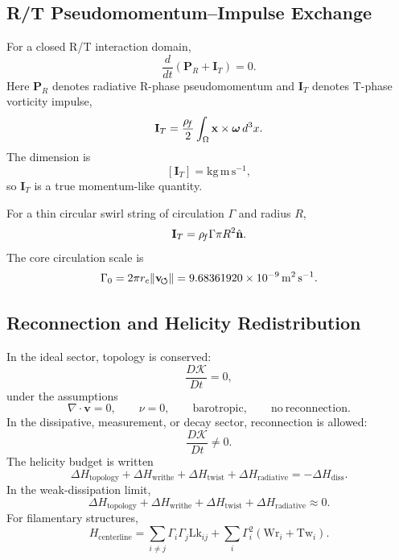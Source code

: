     \subsection{R/T Pseudomomentum--Impulse Exchange}
        
        For a closed R/T interaction domain,
        \[
            \frac{d}{dt}
            \left(
                \mathbf P_R+\mathbf I_T
            \right)
            =
            0.
        \]
        Here \(\mathbf P_R\) denotes radiative R-phase pseudomomentum and
        \(\mathbf I_T\) denotes T-phase vorticity impulse,
        \[
            \mathbf I_T
            =
            \frac{\rho_{\!f}}{2}
            \int_{\Omega}
            \mathbf x\times\boldsymbol\omega\,d^3x .
        \]
        The dimension is
        \[
            [\mathbf I_T]
            =
            \mathrm{kg\,m\,s^{-1}},
        \]
        so \(\mathbf I_T\) is a true momentum-like quantity.
        
        For a thin circular swirl string of circulation \(\Gamma\) and radius \(R\),
        \[
            \mathbf I_T
            =
            \rho_{\!f}\Gamma\pi R^2\hat{\mathbf n}.
        \]
        The core circulation scale is
        \[
            \Gamma_0
            =
            2\pi r_c\|\mathbf{v}_{\!\boldsymbol{\circlearrowleft}}\|
            =
            9.68361920\times10^{-9}\,\mathrm{m^2\,s^{-1}}.
        \]
    
    \subsection{Reconnection and Helicity Redistribution}
        
        In the ideal sector, topology is conserved:
        \[
            \frac{D\mathcal K}{Dt}=0,
        \]
        under the assumptions
        \[
            \nabla\cdot\mathbf v=0,
            \qquad
            \nu=0,
            \qquad
            \mathrm{barotropic},
            \qquad
            \mathrm{no\ reconnection}.
        \]
        In the dissipative, measurement, or decay sector, reconnection is allowed:
        \[
            \frac{D\mathcal K}{Dt}\neq0.
        \]
        The helicity budget is written
        \[
            \Delta H_{\mathrm{topology}}
            +
            \Delta H_{\mathrm{writhe}}
            +
            \Delta H_{\mathrm{twist}}
            +
            \Delta H_{\mathrm{radiative}}
            =
            -\Delta H_{\mathrm{diss}}.
        \]
        In the weak-dissipation limit,
        \[
            \Delta H_{\mathrm{topology}}
            +
            \Delta H_{\mathrm{writhe}}
            +
            \Delta H_{\mathrm{twist}}
            +
            \Delta H_{\mathrm{radiative}}
            \approx
            0.
        \]
        For filamentary structures,
        \[
            H_{\mathrm{centerline}}
            =
            \sum_{i\neq j}
            \Gamma_i\Gamma_j\mathrm{Lk}_{ij}
            +
            \sum_i
            \Gamma_i^2
            \left(
                \mathrm{Wr}_i+\mathrm{Tw}_i
            \right).
        \]
    
